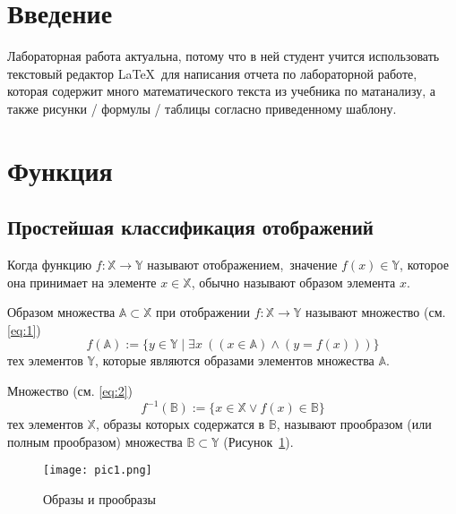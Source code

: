 \section*{Введение}

Лабораторная работа актуальна, потому что в ней студент учится использовать текстовый редактор \LaTeX\ для написания отчета по лабораторной работе, которая содержит много математического текста из учебника по матанализу\cite{matan}, а также рисунки / формулы / таблицы согласно приведенному шаблону.


\newpage
\section{Функция}

\subsection{Простейшая классификация отображений}

Когда функцию $f\colon \mathbb{X} \to \mathbb{Y}$ называют отображением, значение $f(x) \in \mathbb{Y}$, которое она принимает на элементе $x \in \mathbb{X}$, обычно называют образом элемента $x$.

Образом множества $\mathbb{A} \subset \mathbb{X}$ при отображении $f\colon \mathbb{\mathbb{X}} \to \mathbb{Y}$ называют множество (см. \eqref{eq:1})
\begin{equation}
\label{eq:1}
    f(\mathbb{A}) := \{y \in \mathbb{Y} \mid \exists x \ ((x \in \mathbb{A})\land(y=f(x)))\} 
\end{equation}
тех элементов $\mathbb{Y}$, которые являются образами элементов множества $\mathbb{A}$.


Множество (см. \eqref{eq:2})
\begin{equation}
\label{eq:2}
f^{-1}(\mathbb{B}) := \{ x \in \mathbb{X} \lor f(x) \in \mathbb{B}\}
\end{equation}
тех элементов $\mathbb{X}$, образы которых содержатся в $\mathbb{B}$, называют прообразом (или
полным прообразом) множества $\mathbb{B} \subset \mathbb{Y}$ (Рисунок~\ref{pic:pic1}).

\begin{figure}[H]
	\begin{center}
		\texttt{[image: pic1.png]}
		\caption{Образы и прообразы}
		\label{pic:pic1} %
	\end{center}
\end{figure}

